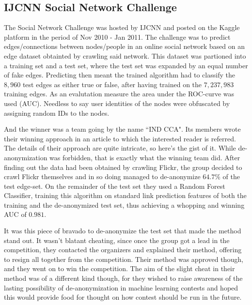 \documentclass{llncs}
\begin{document}
\subsection{IJCNN Social Network Challenge}
The Social Network Challenge was hosted by IJCNN and posted on the Kaggle platform in the period of Nov 2010 - Jan 2011. The challenge was to predict edges/connections between nodes/people in an online social network based on an edge dataset obtainted by crawling said network. This dataset was partioned into a training set and a test set, where the test set was expanded by an equal number of fake edges. Predicting then meant the trained algorithm had to classify the $8,960$ test edges as either true or false, after having trained on the $7,237,983$ training edges. As an evalutation measure the area under the ROC-curve was used (AUC). Needless to say user identities of the nodes were obfuscated by assigning random IDs to the nodes.

And the winner was a team going by the name ``IND CCA". Its members wrote their winning approach in an article \cite{6033446} to which the interested reader is referred. The details of their approach are quite intricate, so here's the gist of it. While de-anonymization was forbidden, that is exactly what the winning team did. After finding out the data had been obtained by crawling Flickr, the group decided to crawl Flickr themselves and in so doing managed to de-anonymize $64.7 \%$ of the test edge-set. On the remainder of the test set they used a Random Forest Classifier, training this algorithm on standard link prediction features of both the training and the de-anonymized test set, thus achieving a whopping and winning AUC of $0.981$.

It was this piece of bravado to de-anonymize the test set that made the method stand out. It wasn't blatant cheating, since once the group got a lead in the competition, they contacted the organizers and explained their method, offering to resign all together from the competition. Their method was approved though, and they went on to win the competition. The aim of the slight cheat in their method was of a different kind though, for they wished to raise awareness of the lasting possibility of de-anonymization in machine learning contests and hoped this would provide food for thought on how contest should be run in the future.
\end{document}
